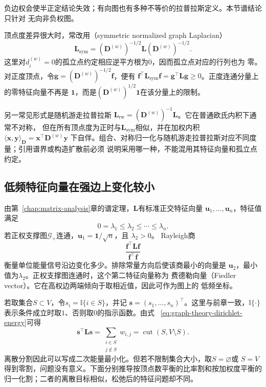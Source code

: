 负边权会使半正定结论失效；有向图也有多种不等价的拉普拉斯定义。本节谱结论只针对
无向非负权图。

顶点度差异很大时，常改用（symmetric normalized graph
Laplacian）
\begin{equation}
  \bm{L}_{\mathrm{sym}}
  =(\bm{D}^{(w)})^{-1/2}\bm{L}(\bm{D}^{(w)})^{-1/2}.
  \label{eq:graph-theory-normalized-laplacian}
\end{equation}
这里对\(d_i^{(w)}=0\)的孤立点约定相应逆平方根为\(0\)，因而孤立点对应的行列也为
零。对正度顶点，令\(\bm{g}=(\bm{D}^{(w)})^{-1/2}\bm{f}\)，便有
\(\bm{f}^{\top}\bm{L}_{\mathrm{sym}}\bm{f}
=\bm{g}^{\top}\bm{L}\bm{g}\geq0\)。正度连通分量上的零特征向量不再是
\(\bm{1}\)，而是\((\bm{D}^{(w)})^{1/2}\bm{1}\)在该分量上的限制。

另一常见形式是随机游走拉普拉斯
\(\bm{L}_{\mathrm{rw}}=(\bm{D}^{(w)})^{-1}\bm{L}\)。它在普通欧氏内积下通常不对称，
但在所有顶点度为正时与\(\bm{L}_{\mathrm{sym}}\)相似，并在加权内积
\(\langle\bm{x},\bm{y}\rangle_{\bm{D}}=\bm{x}^{\top}\bm{D}^{(w)}\bm{y}\)
下自伴。组合、对称归一化与随机游走拉普拉斯对应不同度量；引用谱界或构造扩散前必须
说明采用哪一种，不能混用其特征向量和孤立点约定。

\subsection{低频特征向量在强边上变化较小}

由第~\ref{chap:matrix-analysis}章的谱定理，\(\bm{L}\)有标准正交特征向量
\(\bm{u}_1,\ldots,\bm{u}_n\)，特征值满足
\[
  0=\lambda_1\leq\lambda_2\leq\cdots\leq\lambda_n.
\]
若正权支撑图\(\mathcal{G}_+\)连通，\(\bm{u}_1=\bm{1}/\sqrt{n}\)，且
\(\lambda_2>0\)。
Rayleigh商
\[
  \frac{\bm{f}^{\top}\bm{L}\bm{f}}
       {\bm{f}^{\top}\bm{f}}
\]
衡量单位能量信号沿边变化多少。排除常量方向后使该商最小的向量是
\(\bm{u}_2\)，最小值为\(\lambda_2\)。正权支撑图连通时，这个第二特征向量称为
费德勒向量（Fiedler vector）。它在高权边两端倾向于取相近值，因此可作为图上的
低频坐标。

若取集合\(S\subset V\)，令\(s_i=\mathbb{I}\{i\in S\}\)，并记
\(\bm{s}=(s_1,\ldots,s_n)^{\top}\)。这里与前章一致，\(\mathbb{I}\{\cdot\}\)
表示条件成立时取\(1\)、否则取\(0\)的指示函数。由式
~\eqref{eq:graph-theory-dirichlet-energy}可得
\begin{equation}
  \bm{s}^{\top}\bm{L}\bm{s}
  =\sum_{\substack{i\in S\\j\notin S}}w_{i,j}
  =
  \operatorname{cut}(S,V\setminus S).
  \label{eq:graph-theory-indicator-cut-energy}
\end{equation}
离散分割因此可以写成二次能量最小化。但若不限制集合大小，取\(S=\varnothing\)或
\(S=V\)得到零割，问题没有意义。下面分别推导按顶点数平衡的比率割和按加权度平衡的
归一化割；二者的离散目标相似，松弛后的特征问题却不同。


